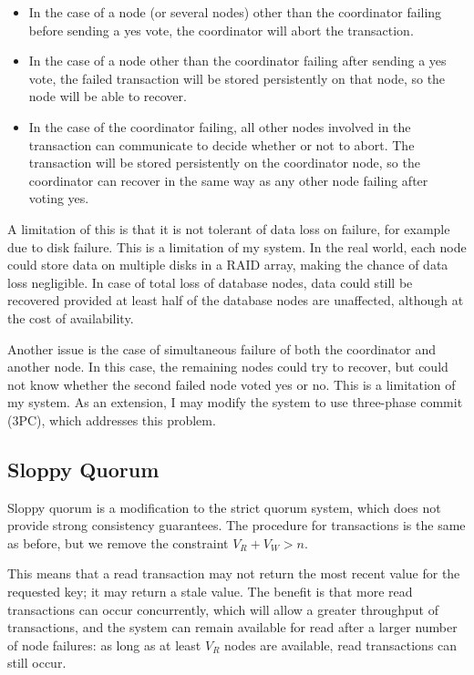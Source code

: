 \documentclass[12pt,a4paper]{article}
\begin{document}
\begin{itemize}
  \item
  In the case of a node (or several nodes) other than the coordinator failing before sending a yes vote, the coordinator will abort the transaction.

  \item
  In the case of a node other than the coordinator failing after sending a yes vote, the failed transaction will be stored persistently on that node, so the node will be able to recover.

  \item
  In the case of the coordinator failing, all other nodes involved in the transaction can communicate to decide whether or not to abort. The transaction will be stored persistently on the coordinator node, so the coordinator can recover in the same way as any other node failing after voting yes.

\end{itemize}

A limitation of this is that it is not tolerant of data loss on failure, for example due to disk failure. This is a limitation of my system. In the real world, each node could store data on multiple disks in a RAID array, making the chance of data loss negligible. In case of total loss of database nodes, data could still be recovered provided at least half of the database nodes are unaffected, although at the cost of availability.

Another issue is the case of simultaneous failure of both the coordinator and another node. In this case, the remaining nodes could try to recover, but could not know whether the second failed node voted yes or no. This is a limitation of my system. As an extension, I may modify the system to use three-phase commit (3PC), which addresses this problem.

\subsection*{Sloppy Quorum}

Sloppy quorum is a modification to the strict quorum system, which does not provide strong consistency guarantees. The procedure for transactions is the same as before, but we remove the constraint $V_R + V_W > n$.

This means that a read transaction may not return the most recent value for the requested key; it may return a stale value. The benefit is that more read transactions can occur concurrently, which will allow a greater throughput of transactions, and the system can remain available for read after a larger number of node failures: as long as at least $V_R$ nodes are available, read transactions can still occur.
\end{document}
